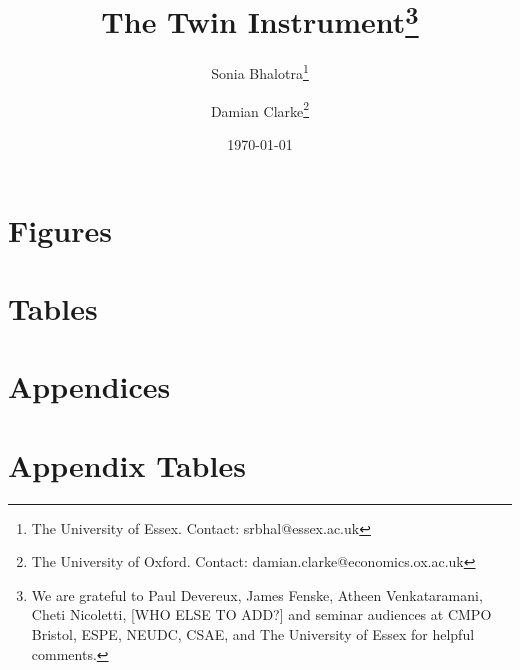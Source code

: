 \documentclass{article}[11pt,subeqn]
\title{The Twin Instrument\footnote{We are grateful to Paul Devereux, James Fenske, 
Atheen Venkataramani, Cheti Nicoletti,  [WHO ELSE TO ADD?] and seminar audiences at CMPO Bristol, 
ESPE, NEUDC, CSAE, and The University of Essex for helpful comments.}}
\author{Sonia Bhalotra\thanks{The University of Essex.  Contact: srbhal@essex.ac.uk} 
\and Damian Clarke\thanks{The University of Oxford.  Contact: damian.clarke@economics.ox.ac.uk}}
\date{\today}
\newcommand{\twinfolder}{./../../../Twins}
\begin{document}
\begin{spacing}{1.4}

\maketitle



\newpage
\section*{Figures}

\clearpage

\section*{Tables}

\newpage



\newpage
\appendix
\section*{Appendices}

\section{Appendix Tables}



\end{spacing}
\end{document}
